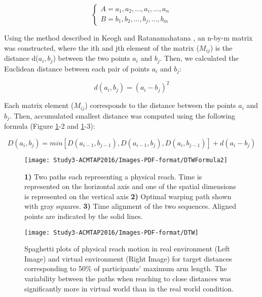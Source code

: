 \begin{equation} \label{pathA}
\begin{cases}
A =  a_1, a_2, ..., a_i, ..., a_n	\\	
B =  b_1, b_2, ..., b_j, ..., b_m
\end{cases}
\end{equation}


Using the method described in Keogh and Ratanamahatana \cite{kr05}, an n-by-m matrix was constructed, where the ith and jth element of the matrix ($M_{ij}$) is the distance d($a_i, b_j$) between the two points $a_i$ and $b_j$. Then, we calculated the Euclidean distance between each pair of points $a_i$ and $b_j$:

\begin{equation} \label{euclidean distance1}
d(a_i, b_j) = (a_i-b_j)^2
\end{equation}

Each matrix element ($M_{ij}$) corresponds to the distance between the points $a_i$ and $b_j$. Then, accumulated smallest distance was computed using the following formula (Figure \ref{fig:DTWMethod}-2 and \ref{fig:DTWMethod}-3):

\begin{equation} \label{euclidean distance2}
D(a_i, b_j) = min[D(a_{i-1}, b_{j-1}), D(a_{i-1}, b_{j}), D(a_{i}, b_{j-1})] + d(a_i-b_j)
\end{equation}

\begin{figure}[!htb]
	\centering
	\texttt{[image: Study3-ACMTAP2016/Images-PDF-format/DTWFormula2]}
	\caption{\textbf{1)} Two paths each representing a physical reach. Time is represented on the horizontal axis and one of the spatial dimensions is represented on the vertical axis \textbf{2)} Optimal warping path shown with gray squares. \textbf{3)} Time alignment of the two sequences. Aligned points are indicated by the solid lines.}
	\label{fig:DTWMethod}	
\end{figure}

\begin{figure}[!htb]
	\centering
	\texttt{[image: Study3-ACMTAP2016/Images-PDF-format/DTW]}
	\caption{Spaghetti plots of physical reach motion in real environment (Left Image) and virtual environment (Right Image) for target distances corresponding to 50\% of participants' maximum arm length. The variability between the paths when reaching to close distances was significantly more in virtual world than in the real world condition.}
	\label{fig:DTW}	
\end{figure}

